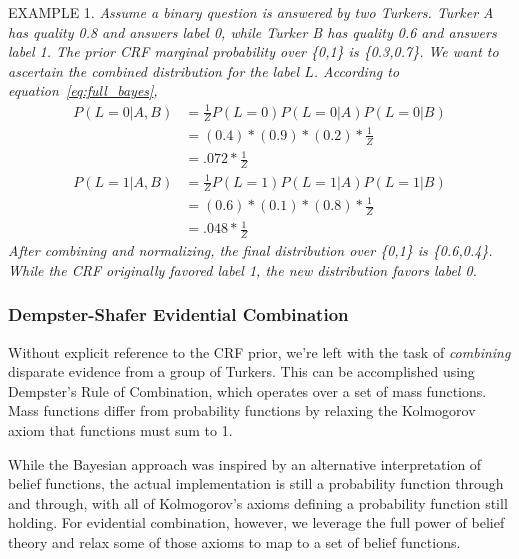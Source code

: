 EXAMPLE 1. \textit{
Assume a binary question is answered by two Turkers.  Turker A has quality 0.8 and answers label 0, while Turker B has quality 0.6 and answers label 1.  The prior CRF marginal probability over \{0,1\} is \{0.3,0.7\}.  We want to ascertain the combined distribution for the label $L$.  According to equation~\ref{eq:full_bayes}, 
\begin{align}
P(L=0|A,B) &= \frac{1}{Z}P(L=0)P(L=0|A)P(L=0|B)\nonumber\\
	        &= (0.4)*(0.9)*(0.2)*\frac{1}{Z}\nonumber\\
	        &= .072*\frac{1}{Z}\\
P(L=1|A,B) &= \frac{1}{Z}P(L=1)P(L=1|A)P(L=1|B)\nonumber\\
	        &= (0.6)*(0.1)*(0.8)*\frac{1}{Z}\nonumber\\
	        &= .048*\frac{1}{Z}
\end{align}
After combining and normalizing, the final distribution over \{0,1\} is \{0.6,0.4\}.  While the CRF originally favored label 1, the new distribution favors label 0.
}

\subsubsection{Dempster-Shafer Evidential Combination}

Without explicit reference to the CRF prior, we're left with the task of \textit{combining} disparate evidence from a group of Turkers.  This can be accomplished using Dempster's Rule of Combination, which operates over a set of mass functions.  Mass functions differ from probability functions by relaxing the Kolmogorov axiom that functions must sum to 1.

While the Bayesian approach was inspired by an alternative interpretation of belief functions, the actual implementation is still a probability function through and through, with all of Kolmogorov's axioms defining a probability function still holding.  For evidential combination, however, we leverage the full power of belief theory and relax some of those axioms to map to a set of belief functions.  


